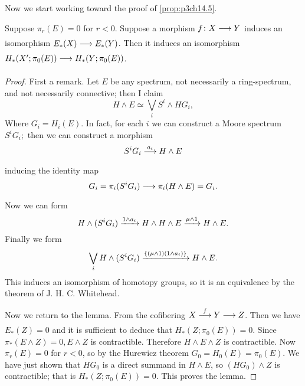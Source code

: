 \documentclass[../main]{subfiles}
\begin{document}
Now we start working toward the proof of \ref{prop:p3ch14.5}.

\begin{lemma} \label{lem:p3ch14.12}
Suppose $ \pi_{r}(E)=0$ for $r<0$. Suppose a morphism $f\colon  X \lar{}  Y $ induces an isomorphism $E_{\ast}(X) \lar{} E_{\ast}(Y)$. Then it induces an isomorphism $H_{\ast}(X'; \pi_{0}(E)) \lar{} H_{\ast}(Y;\pi_{0}(E))$. 
\begin{proof} 
    First a remark. Let $E$ be any spectrum, not necessarily a ring-spectrum, and not necessarily connective; then I claim
    \[
      H \wedge E \simeq \bigvee_{i} S^i \wedge HG_i, 
    \] 
    Where $G_{i} = H_{i}(E)$. In fact, for each $i$ we can construct a Moore spectrum $S^iG_{i};$ then we can construct a morphism
    \[
      S^iG_{i} \vra{a_{i}} H \wedge E 
    \] 
    inducing the identity map
    \[
      G_{i} = \pi_{i}(S^iG_{i}) \lar{} \pi_{i}(H \wedge E)= G_{i}.
    \] 
    Now we can form 
    \[
      H \wedge (S^iG_i) \vra{1 \wedge a_{i}} H \wedge H \wedge E \vra{\mu \wedge 1} H \wedge E.  
    \] 
    Finally we form 
    \[
      \bigvee_{i} H \wedge (S^iG_{i}) \vra{\{(\mu \wedge 1) (1 \wedge a_{i})\} } H \wedge E.
    \] 
    This induces an isomorphism of homotopy groups, so it is an equivalence by the theorem of J. H. C. Whitehead.

    Now we return to the lemma. From the cofibering $X\vra{f} Y \lar{} Z$. Then we have $E_{\ast}(Z)=0$ and it is sufficient to deduce that $H_{\ast}(Z;\pi_{0}(E))=0$. Since $ \pi_{\ast}(E \wedge Z)=0, E \wedge Z$ is contractible. Therefore $H \wedge E \wedge Z$ is contractible. Now $ \pi_{r}(E)=0$ for $r<0$, so by the Hurewicz theorem $ G_0 = H_0(E) = \pi_{0}(E)$. We have just shown that $HG_0$ is a direct summand in $H \wedge E$, so $(HG_0) \wedge Z$ is contractible; that is $H_{\ast}(Z; \pi_{0}(E))=0$. This proves the lemma.
\end{proof}

\end{lemma}
\end{document}
